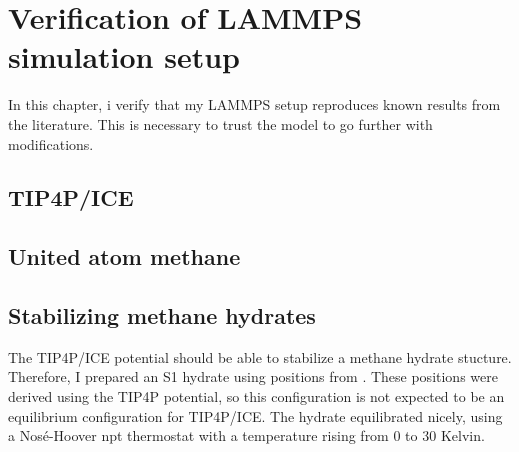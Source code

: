 \chapter{Verification of LAMMPS simulation setup}
In this chapter, i verify that my LAMMPS setup reproduces known results from the literature. This is necessary to trust the model to go further with modifications. 
\section{TIP4P/ICE}
\section{United atom methane}
\section{Stabilizing methane hydrates}
The TIP4P/ICE potential should be able to stabilize a methane hydrate stucture. Therefore, I prepared an S1 hydrate using positions from \cite{Takeuchi2013}. These positions were derived using the TIP4P potential, so this configuration is not expected to be an equilibrium configuration for TIP4P/ICE. The hydrate equilibrated nicely, using a Nosé-Hoover npt thermostat with a temperature rising from 0 to 30 Kelvin. 

